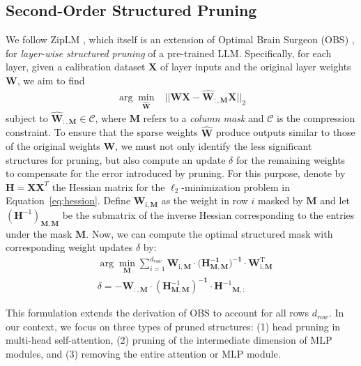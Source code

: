 \subsection{Second-Order Structured Pruning}
\label{sec:method:prune}
We follow ZipLM \citep{kurtic2023ziplm}, which itself is an extension of Optimal Brain Surgeon (OBS) \citep{hassibi1992second, kurtic2022optimal}, for \emph{layer-wise structured pruning} of a pre-trained LLM. Specifically, for each layer, given a calibration dataset $\mathbf{X}$ of layer inputs and the original layer weights $\mathbf{W}$, we aim to find
\begin{align}
    \arg \min_{\mathbf{\hat{W}}} &||\mathbf{WX} - \mathbf{\hat{W}_{:,M}X}||_2 \label{eq:hession}
\end{align}
{subject to} 
    $\mathbf{\hat{W}_{:, M}} \in \mathcal{C}$, where $\mathbf{M}$ refers to a \emph{column mask} and $\mathcal{C}$ is the compression constraint. To ensure that the sparse weights $\mathbf{\hat{W}}$ produce outputs similar to those of the original weights $\mathbf{W}$, we must not only identify the less significant structures for pruning, but also compute an update $\delta$ for the remaining weights to compensate for the error introduced by pruning. For this purpose, denote by $\mathbf{H} = \mathbf{XX}^T$ the Hessian matrix for the $\ell_2$-minimization problem in Equation~\ref{eq:hession}. Define $\mathbf{W_{\mathrm{i},M}}$ as the weight in row $i$ masked by $\mathbf{M}$ and let $(\mathbf{H}^{-1})_{\mathbf{M,M}}$ be the submatrix of the inverse Hessian corresponding to the entries under the mask $\mathbf{M}$. Now, we can compute the optimal structured mask with corresponding weight updates $\delta$ by:
\begin{align}
    &\arg \min_{\mathbf M} \sum_{i=1}^{d_{row}} \mathbf{W_{\mathrm{i}, M} \cdot (\mathbf{H}^{-1}_{\mathbf{M,M}}})^{\mathbf{-1}} \cdot \mathbf{W_{\mathrm{i}, M}^{\mathrm{T}}}\\
    &\delta = - \mathbf{W_{:, M}} \cdot (\mathbf{H}^{-1}_{\mathbf{M,M}})^{\mathbf{-1}} \cdot \mathbf{H^{\mathrm{-1}}}_{\mathbf{M}, :}
\end{align}

This formulation extends the derivation of OBS to account for all rows $d_{row}$. In our context, we focus on three types of pruned structures: (1) head pruning in multi-head self-attention, (2) pruning of the intermediate dimension of MLP modules, and (3) removing the entire attention or MLP module. 


\vspace{-1em}


